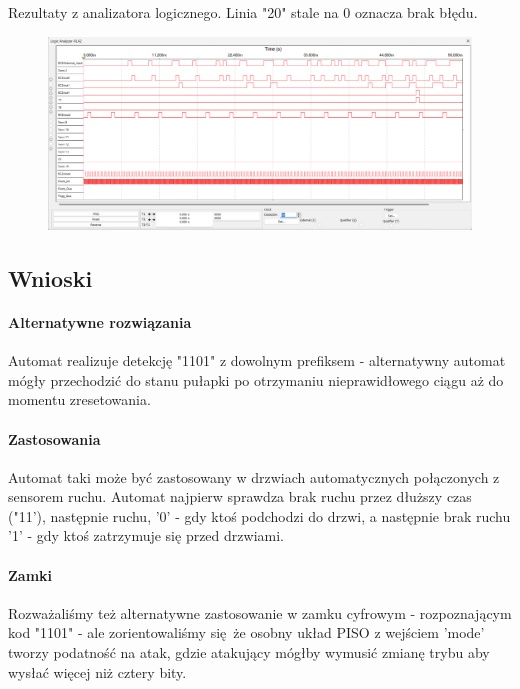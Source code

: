 \documentclass{article}
\begin{document}
Rezultaty z analizatora logicznego. Linia "20" stale na 0 oznacza brak błędu.
\begin{figure}[H]
\includegraphics[width = \textwidth]{3b_analyzer}
\end{figure}
\subsection{Wnioski}
\paragraph{Alternatywne rozwiązania}
Automat realizuje detekcję "1101" z dowolnym prefiksem - alternatywny automat mógły przechodzić do stanu pułapki po otrzymaniu nieprawidłowego ciągu aż do momentu zresetowania. 
\paragraph{Zastosowania}
Automat taki może być zastosowany w drzwiach automatycznych połączonych z sensorem ruchu.
Automat najpierw sprawdza brak ruchu przez dłuższy czas ("11'), następnie ruchu, '0' - gdy ktoś podchodzi do drzwi, a następnie brak ruchu '1' - gdy ktoś zatrzymuje się przed drzwiami.
\paragraph{Zamki}
Rozważaliśmy też alternatywne zastosowanie w zamku cyfrowym - rozpoznającym kod "1101" - ale zorientowaliśmy się że osobny układ PISO z wejściem 'mode' tworzy podatność na atak, gdzie atakujący mógłby wymusić zmianę trybu aby wysłać więcej niż cztery bity.
\end{document}
